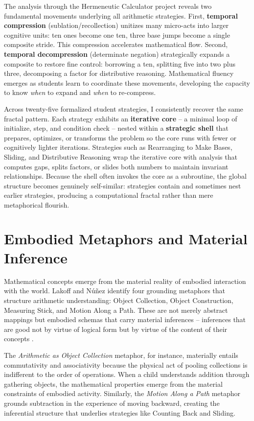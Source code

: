 \documentclass[12pt]{book}
\begin{document}
The analysis through the Hermeneutic Calculator project reveals two fundamental movements underlying all arithmetic strategies. First, \textbf{temporal compression} (sublation/recollection) unitizes many micro-acts into larger cognitive units: ten ones become one ten, three base jumps become a single composite stride. This compression accelerates mathematical flow. Second, \textbf{temporal decompression} (determinate negation) strategically expands a composite to restore fine control: borrowing a ten, splitting five into two plus three, decomposing a factor for distributive reasoning. Mathematical fluency emerges as students learn to coordinate these movements, developing the capacity to know \textit{when} to expand and \textit{when} to re-compress.

Across twenty-five formalized student strategies, I consistently recover the same fractal pattern. Each strategy exhibits an \textbf{iterative core} -- a minimal loop of initialize, step, and condition check -- nested within a \textbf{strategic shell} that prepares, optimizes, or transforms the problem so the core runs with fewer or cognitively lighter iterations. Strategies such as Rearranging to Make Bases, Sliding, and Distributive Reasoning wrap the iterative core with analysis that computes gaps, splits factors, or slides both numbers to maintain invariant relationships. Because the shell often invokes the core as a subroutine, the global structure becomes genuinely self-similar: strategies contain and sometimes nest earlier strategies, producing a computational fractal rather than mere metaphorical flourish.

\section{Embodied Metaphors and Material Inference}

Mathematical concepts emerge from the material reality of embodied interaction with the world. Lakoff and Núñez \parencite{Lakoff2000} identify four grounding metaphors that structure arithmetic understanding: Object Collection, Object Construction, Measuring Stick, and Motion Along a Path. These are not merely abstract mappings but embodied schemas that carry material inferences -- inferences that are good not by virtue of logical form but by virtue of the content of their concepts \parencite{Brandom2008}.

The \textit{Arithmetic as Object Collection} metaphor, for instance, materially entails commutativity and associativity because the physical act of pooling collections is indifferent to the order of operations. When a child understands addition through gathering objects, the mathematical properties emerge from the material constraints of embodied activity. Similarly, the \textit{Motion Along a Path} metaphor grounds subtraction in the experience of moving backward, creating the inferential structure that underlies strategies like Counting Back and Sliding.
\end{document}
